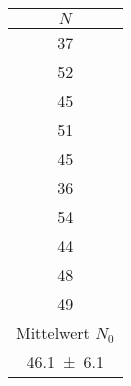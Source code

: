 \begin{tabular}{c}
\toprule
{$N$} \\
\midrule
 37   \\
 52   \\
 45   \\
 51   \\
 45   \\
 36   \\
 54   \\
 44   \\
 48   \\
 49   \\
\midrule
{Mittelwert $N_0$} \\
\num{46.1 +- 6.1} \\
\bottomrule
\end{tabular}
